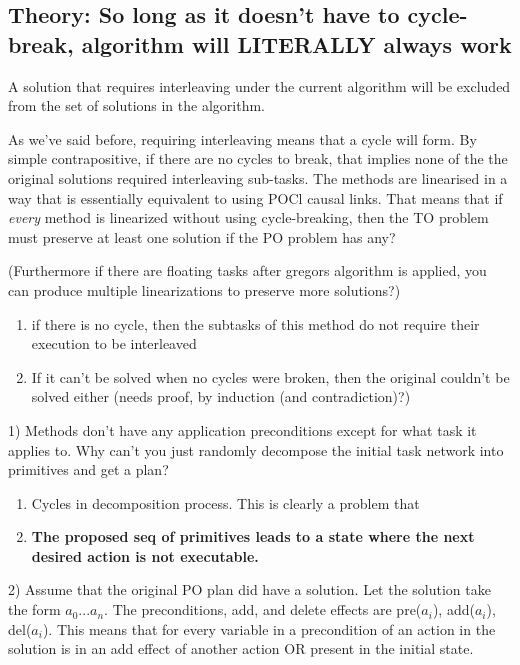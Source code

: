 \subsection{Theory: So long as it doesn't have to cycle-break, algorithm will LITERALLY always work}
	 A solution that requires interleaving under the current algorithm 
	will be excluded from the set of solutions in the algorithm.
	
	As we've said before, requiring interleaving means that a cycle will form.
	By simple contrapositive, if there are no cycles to break, that implies none of the the original solutions required interleaving sub-tasks.
	The methods are linearised in a way that is essentially equivalent to using POCl causal links. That means that if \emph{every} method is linearized without using cycle-breaking, then the TO problem must preserve at least one solution if the PO problem has any?
	
	(Furthermore if there are floating tasks after gregors algorithm is applied, you can produce multiple linearizations to preserve more solutions?)
	
	\begin{enumerate}
		\item if there is no cycle, then the subtasks of this method do not require their execution to be interleaved  
		\item If it can't be solved when no cycles were broken, then the original couldn't be solved either (needs proof, by induction (and contradiction)?)		
	\end{enumerate}



	1) Methods don't have any application preconditions except for what task it applies to.
	Why can't you just randomly decompose the initial task network into primitives and get a plan?
	\begin{enumerate}
		\item Cycles in decomposition process. This is clearly a problem that  
		\item \textbf{The proposed seq of primitives leads to a state where the next desired action is not executable.}
	\end{enumerate}

	
	
	2) Assume that the original PO plan did have a solution. Let the solution take the form $a_0 ... a_n$. The preconditions, add, and delete effects are pre($a_i$), add($a_i$), del($a_i$).	This means that for every variable in a precondition of an action in the solution is in an add effect of another action OR present in the initial state.
	
